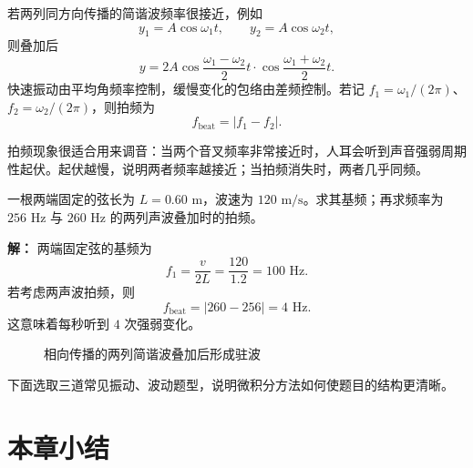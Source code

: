 若两列同方向传播的简谐波频率很接近，例如
\[
y_1=A\cos\omega_1 t,
\qquad
y_2=A\cos\omega_2 t,
\]
则叠加后
\begin{equation}
 y=2A\cos\frac{\omega_1-\omega_2}{2}t\cdot \cos\frac{\omega_1+\omega_2}{2}t.
\label{eq:beat}
\end{equation}
快速振动由平均角频率控制，缓慢变化的包络由差频控制。若记 $f_1=\omega_1/(2\pi)$、$f_2=\omega_2/(2\pi)$，则拍频为
\[
f_{\text{beat}}=|f_1-f_2|.
\]

\begin{remark}
拍频现象很适合用来调音：当两个音叉频率非常接近时，人耳会听到声音强弱周期性起伏。起伏越慢，说明两者频率越接近；当拍频消失时，两者几乎同频。
\end{remark}

\begin{example}
一根两端固定的弦长为 $L=0.60\text{ m}$，波速为 $120\text{ m/s}$。求其基频；再求频率为 $256\text{ Hz}$ 与 $260\text{ Hz}$ 的两列声波叠加时的拍频。

\textbf{解：} 两端固定弦的基频为
\[
f_1=\frac{v}{2L}=\frac{120}{1.2}=100\text{ Hz}.
\]
若考虑两声波拍频，则
\[
f_{\text{beat}}=|260-256|=4\text{ Hz}.
\]
这意味着每秒听到 $4$ 次强弱变化。
\end{example}

\begin{figure}[htbp]
\centering
{}
\caption{相向传播的两列简谐波叠加后形成驻波}
\end{figure}

下面选取三道常见振动、波动题型，说明微积分方法如何使题目的结构更清晰。

\section*{本章小结}

